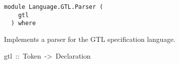 \label{module:Language.GTL.Parser}
\haddockbeginheader
{\haddockverb\begin{verbatim}
module Language.GTL.Parser (
    gtl
  ) where\end{verbatim}}
\haddockendheader

Implements a parser for the GTL specification language.
\par

\begin{haddockdesc}
\item[
gtl\ ::\ {\char 91}Token{\char 93}\ ->\ {\char 91}Declaration{\char 93}
]
\end{haddockdesc}